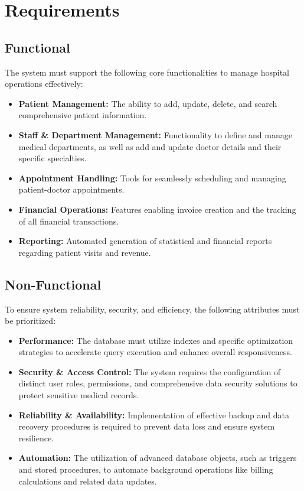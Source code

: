 \section{Requirements}

\subsection{Functional}
The system must support the following core functionalities to manage hospital operations effectively:

\begin{itemize}
    \item \textbf{Patient Management:} The ability to add, update, delete, and search comprehensive patient information.
    \item \textbf{Staff \& Department Management:} Functionality to define and manage medical departments, as well as add and update doctor details and their specific specialties.
    \item \textbf{Appointment Handling:} Tools for seamlessly scheduling and managing patient-doctor appointments.
    \item \textbf{Financial Operations:} Features enabling invoice creation and the tracking of all financial transactions.
    \item \textbf{Reporting:} Automated generation of statistical and financial reports regarding patient visits and revenue.
\end{itemize}

\subsection{Non-Functional}
To ensure system reliability, security, and efficiency, the following attributes must be prioritized:

\begin{itemize}
    \item \textbf{Performance:} The database must utilize indexes and specific optimization strategies to accelerate query execution and enhance overall responsiveness.
    \item \textbf{Security \& Access Control:} The system requires the configuration of distinct user roles, permissions, and comprehensive data security solutions to protect sensitive medical records.
    \item \textbf{Reliability \& Availability:} Implementation of effective backup and data recovery procedures is required to prevent data loss and ensure system resilience.
    \item \textbf{Automation:} The utilization of advanced database objects, such as triggers and stored procedures, to automate background operations like billing calculations and related data updates.
\end{itemize}


